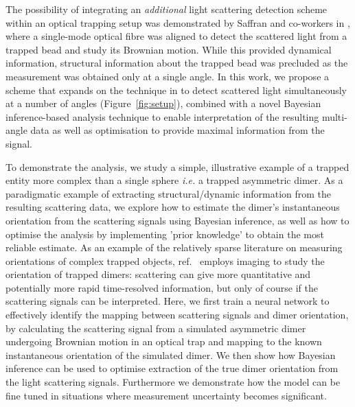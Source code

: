 \documentclass[final,  3p]{elsarticle}
\begin{document}
The possibility of integrating an \textit{additional} light scattering detection scheme 
within an optical trapping setup was demonstrated by Saffran and co-workers in \cite{Bar-Ziv_1998}, 
where a single-mode optical fibre was aligned to detect the scattered
light from a trapped bead and study its Brownian motion.  While this provided dynamical 
information, structural information about the trapped bead was precluded as the measurement 
was obtained only at a single angle.  In this work, we propose a scheme that expands on the 
technique in \cite{Bar-Ziv_1998} to detect scattered light simultaneously at a number of 
angles (Figure~\ref{fig:setup}), combined with a novel Bayesian inference-based analysis
 technique to enable interpretation of the resulting multi-angle data as well as 
optimisation to provide maximal information from the signal.

To demonstrate the analysis, we study a simple, illustrative example of a trapped entity 
more complex than a single sphere \textit{i.e.} a trapped asymmetric dimer.  
As a paradigmatic example of extracting structural/dynamic information from the 
resulting scattering data, we explore how to estimate the dimer's instantaneous 
orientation from the scattering signals using Bayesian inference, as well as how 
to optimise the analysis by implementing 'prior knowledge' to obtain the most reliable 
estimate. As an example of the relatively sparse literature on measuring orientations of
 complex trapped objects, ref.~\cite{raudsepp2022estimating} employs imaging to study the 
orientation of trapped dimers: scattering can give more quantitative and potentially more
 rapid time-resolved information, but only of course if the scattering signals can be 
interpreted. Here, we first train a neural network to effectively identify the mapping
 between scattering signals and dimer orientation, by calculating the scattering signal 
from a  simulated asymmetric dimer undergoing Brownian motion in an optical trap and 
mapping to the known instantaneous orientation of the simulated dimer. We then show 
how Bayesian inference can be used to optimise extraction of the true dimer orientation
 from the light scattering signals. Furthermore we demonstrate how the model can be
 fine tuned in situations where measurement uncertainty becomes significant. 
\end{document}
